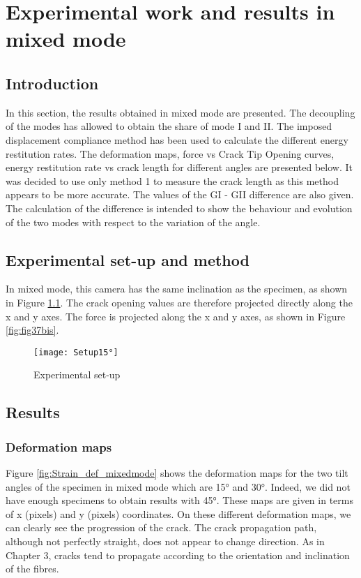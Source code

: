 \chapter{Experimental work and results in mixed mode}
\label{Chapter2}

\section{Introduction}

In this section, the results obtained in mixed mode are presented. The decoupling of the modes has allowed to obtain the share of mode I and II. The imposed displacement compliance method has been used to calculate the different energy restitution rates. The deformation maps, force vs Crack Tip Opening curves, energy restitution rate vs crack length for different angles are presented below. It was decided to use only method 1 to measure the crack length as this method appears to be more accurate. The values of the GI - GII difference are also given. The calculation of the difference is intended to show the behaviour and evolution of the two modes with respect to the variation of the angle.

\section{Experimental set-up and method}

In mixed mode, this camera has the same inclination as the specimen, as shown in Figure \ref{fig:Setup15°}. The crack opening values are therefore projected directly along the x and y axes. The force is projected along the x and y axes, as shown in Figure \ref{fig:fig37bis}.

\begin{figure}[htp]
	\centering
	\texttt{[image: Setup15°]}
	\caption{Experimental set-up}
	\label{fig:Setup15°}
\end{figure}

\section{Results}

\subsection{Deformation maps}

Figure \ref{fig:Strain_def_mixedmode} shows the deformation maps for the two tilt angles of the specimen in mixed mode which are 15° and 30°. Indeed, we did not have enough specimens to obtain results with 45°. These maps are given in terms of x (pixels) and y (pixels) coordinates. On these different deformation maps, we can clearly see the progression of the crack. The crack propagation path, although not perfectly straight, does not appear to change direction. As in Chapter 3, cracks tend to propagate according to the orientation and inclination of the fibres.

